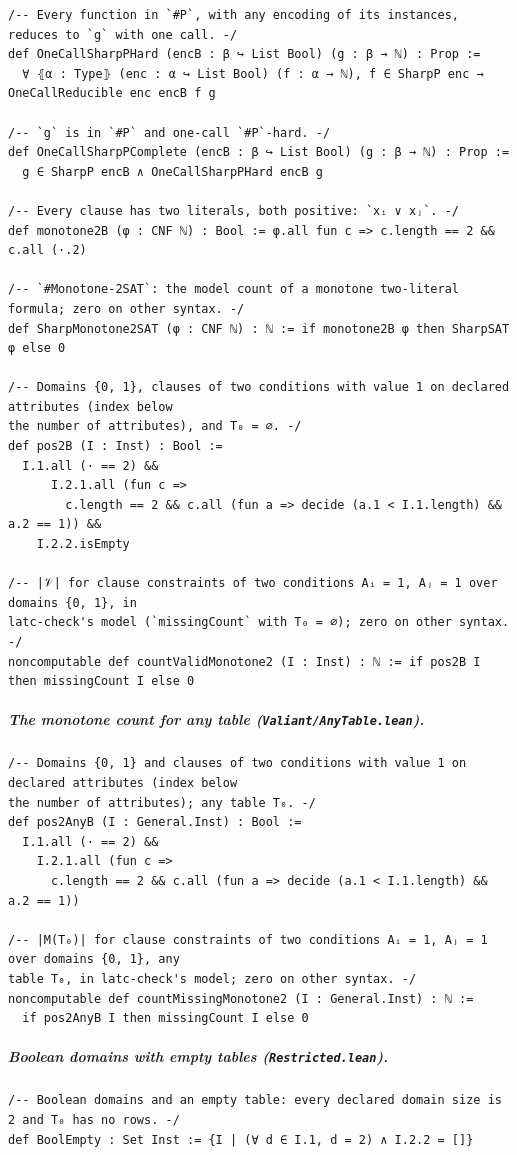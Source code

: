 \documentclass[pdflatex,sn-mathphys-num]{sn-jnl}
\theoremstyle{thmstyleone}
\theoremstyle{thmstylethree}
\begin{document}
\begin{appendices}
\begin{lstlisting}
/-- Every function in `#P`, with any encoding of its instances, reduces to `g` with one call. -/
def OneCallSharpPHard (encB : β ↪ List Bool) (g : β → ℕ) : Prop :=
  ∀ ⦃α : Type⦄ (enc : α ↪ List Bool) (f : α → ℕ), f ∈ SharpP enc → OneCallReducible enc encB f g

/-- `g` is in `#P` and one-call `#P`-hard. -/
def OneCallSharpPComplete (encB : β ↪ List Bool) (g : β → ℕ) : Prop :=
  g ∈ SharpP encB ∧ OneCallSharpPHard encB g

/-- Every clause has two literals, both positive: `xᵢ ∨ xⱼ`. -/
def monotone2B (φ : CNF ℕ) : Bool := φ.all fun c => c.length == 2 && c.all (·.2)

/-- `#Monotone-2SAT`: the model count of a monotone two-literal formula; zero on other syntax. -/
def SharpMonotone2SAT (φ : CNF ℕ) : ℕ := if monotone2B φ then SharpSAT φ else 0

/-- Domains {0, 1}, clauses of two conditions with value 1 on declared attributes (index below
the number of attributes), and T₀ = ∅. -/
def pos2B (I : Inst) : Bool :=
  I.1.all (· == 2) &&
      I.2.1.all (fun c =>
        c.length == 2 && c.all (fun a => decide (a.1 < I.1.length) && a.2 == 1)) &&
    I.2.2.isEmpty

/-- |𝒱| for clause constraints of two conditions Aᵢ = 1, Aⱼ = 1 over domains {0, 1}, in
latc-check's model (`missingCount` with T₀ = ∅); zero on other syntax. -/
noncomputable def countValidMonotone2 (I : Inst) : ℕ := if pos2B I then missingCount I else 0
\end{lstlisting}

\subparagraph*{The monotone count for any table (\texttt{Valiant/AnyTable.lean}).}
\begin{lstlisting}
/-- Domains {0, 1} and clauses of two conditions with value 1 on declared attributes (index below
the number of attributes); any table T₀. -/
def pos2AnyB (I : General.Inst) : Bool :=
  I.1.all (· == 2) &&
    I.2.1.all (fun c =>
      c.length == 2 && c.all (fun a => decide (a.1 < I.1.length) && a.2 == 1))

/-- |M(T₀)| for clause constraints of two conditions Aᵢ = 1, Aⱼ = 1 over domains {0, 1}, any
table T₀, in latc-check's model; zero on other syntax. -/
noncomputable def countMissingMonotone2 (I : General.Inst) : ℕ :=
  if pos2AnyB I then missingCount I else 0
\end{lstlisting}

\subparagraph*{Boolean domains with empty tables (\texttt{Restricted.lean}).}
\begin{lstlisting}
/-- Boolean domains and an empty table: every declared domain size is 2 and T₀ has no rows. -/
def BoolEmpty : Set Inst := {I | (∀ d ∈ I.1, d = 2) ∧ I.2.2 = []}


\end{lstlisting}
\end{appendices}
\end{document}

